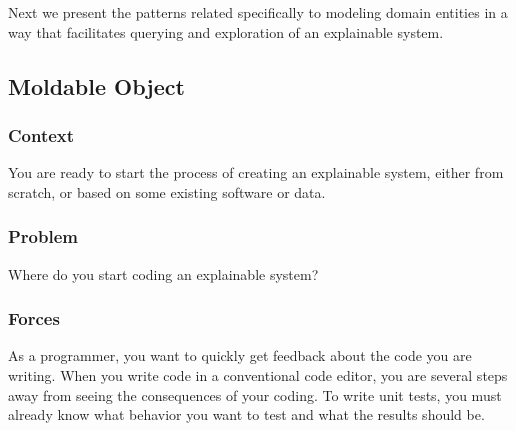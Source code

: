 \documentclass[sigconf]{acmart}
\renewcommand{\nbc}[3]{} %
\newcommand\on[1]{\nbc{ON}{#1}{olive}} %
\newcommand\tg[1]{\nbc{TG}{#1}{blue}}
\newcommand\kh[1]{\nbc{Konrad}{#1}{violet}}
\newcommand\eog[1]{\nbc{Edward}{#1}{purple}}
\begin{document}
Next we present the patterns related specifically to modeling domain entities in a way that facilitates querying and exploration of an explainable system.


\subsection*{Moldable Object}\label{pat:moldableObject}


\subsubsection*{Context}
You are ready to start the process of creating an explainable system, either from scratch, or based on some existing software or data.


\subsubsection*{Problem}
Where do you start coding an explainable system?

\subsubsection*{Forces}
As a programmer, you want to quickly get feedback about the code you are writing.
When you write code in a conventional code editor, you are several steps away from seeing the consequences of your coding.
To write unit tests, you must already know what behavior you want to test and what the results should be.
\end{document}
